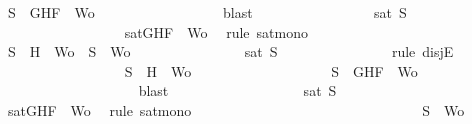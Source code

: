 \begin{isabellebody}
\ {\isachardoublequoteopen}S\ {\isasymsubseteq}\ {\isacharbraceleft}G{\isacharcomma}H{\isacharcomma}F{\isacharbraceright}\ {\isasymunion}\ Wo{\isachardoublequoteclose}\isanewline
\ \ \ \ \ \ \ \ \ \ \ \ \ \ \ \ \isamarkupfalse%
\ blast\ \isanewline
\ \ \ \ \ \ \ \ \ \ \ \ \ \ \isamarkupfalse%
\ {\isachardoublequoteopen}sat\ S{\isachardoublequoteclose}\isanewline
\ \ \ \ \ \ \ \ \ \ \ \ \ \ \ \ \isamarkupfalse%
\ {\isacartoucheopen}sat{\isacharparenleft}{\isacharbraceleft}G{\isacharcomma}H{\isacharcomma}F{\isacharbraceright}\ {\isasymunion}\ Wo{\isacharparenright}{\isacartoucheclose}\ \isamarkupfalse%
\ {\isacharparenleft}rule\ sat{\isacharunderscore}mono{\isacharparenright}\isanewline
\ \ \ \ \ \ \ \ \ \ \ \ \isamarkupfalse%
\isanewline
\ \ \ \ \ \ \ \ \ \ \ \ \ \ \isamarkupfalse%
\ {\isachardoublequoteopen}S\ {\isacharequal}\ {\isacharbraceleft}H{\isacharbraceright}\ {\isasymunion}\ Wo\ {\isasymor}\ S\ {\isacharequal}\ Wo{\isachardoublequoteclose}\isanewline
\ \ \ \ \ \ \ \ \ \ \ \ \ \ \isamarkupfalse%
\ {\isachardoublequoteopen}sat\ S{\isachardoublequoteclose}\isanewline
\ \ \ \ \ \ \ \ \ \ \ \ \ \ \isamarkupfalse%
\ {\isacharparenleft}rule\ disjE{\isacharparenright}\isanewline
\ \ \ \ \ \ \ \ \ \ \ \ \ \ \ \ \isamarkupfalse%
\ {\isachardoublequoteopen}S\ {\isacharequal}\ {\isacharbraceleft}H{\isacharbraceright}\ {\isasymunion}\ Wo{\isachardoublequoteclose}\isanewline
\ \ \ \ \ \ \ \ \ \ \ \ \ \ \ \ \isamarkupfalse%
\ \isamarkupfalse%
\ {\isachardoublequoteopen}S\ {\isasymsubseteq}\ {\isacharbraceleft}G{\isacharcomma}H{\isacharcomma}F{\isacharbraceright}\ {\isasymunion}\ Wo{\isachardoublequoteclose}\isanewline
\ \ \ \ \ \ \ \ \ \ \ \ \ \ \ \ \ \ \isamarkupfalse%
\ blast\ \isanewline
\ \ \ \ \ \ \ \ \ \ \ \ \ \ \ \ \isamarkupfalse%
\ {\isachardoublequoteopen}sat\ S{\isachardoublequoteclose}\isanewline
\ \ \ \ \ \ \ \ \ \ \ \ \ \ \ \ \ \ \isamarkupfalse%
\ {\isacartoucheopen}sat{\isacharparenleft}{\isacharbraceleft}G{\isacharcomma}H{\isacharcomma}F{\isacharbraceright}\ {\isasymunion}\ Wo{\isacharparenright}{\isacartoucheclose}\ \isamarkupfalse%
\ {\isacharparenleft}rule\ sat{\isacharunderscore}mono{\isacharparenright}\isanewline
\ \ \ \ \ \ \ \ \ \ \ \ \ \ \isamarkupfalse%
\isanewline
\ \ \ \ \ \ \ \ \ \ \ \ \ \ \ \ \isamarkupfalse%
\ {\isachardoublequoteopen}S\ {\isacharequal}\ Wo{\isachardoublequoteclose}\isanewline

\end{isabellebody}
